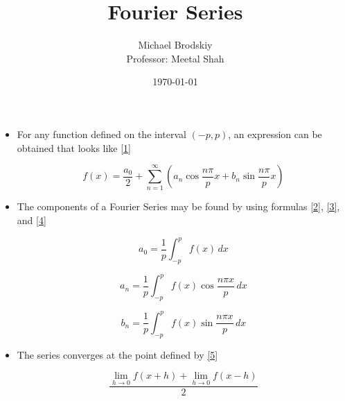 \documentclass[12pt]{article}
\title{Fourier Series}
\date{\today}
\author{Michael Brodskiy\\ \small Professor: Meetal Shah}
\begin{document}
\maketitle

\begin{itemize}

  \item For any function defined on the interval $(-p,p)$, an expression can be obtained that looks like \eqref{1}

    \begin{equation}
    f(x)=\frac{a_0}{2}+\sum_{n=1}^{\infty}\left( a_n\cos\frac{n\pi}{p}x+b_n\sin\frac{n\pi}{p}x \right)
      \label{1}
    \end{equation}

  \item The components of a Fourier Series may be found by using formulas \eqref{2}, \eqref{3}, and \eqref{4}

    \begin{equation}
      a_0=\frac{1}{p}\int_{-p}^pf(x)\,dx
      \label{2}
    \end{equation}

    \begin{equation}
      a_n=\frac{1}{p}\int_{-p}^pf(x)\cos\frac{n\pi x}{p}\,dx
      \label{3}
    \end{equation}

    \begin{equation}
      b_n=\frac{1}{p}\int_{-p}^pf(x)\sin\frac{n\pi x}{p}\,dx
      \label{4}
    \end{equation}

  \item The series converges at the point defined by \eqref{5}

    \begin{equation}
      \frac{\lim_{h\to 0}f(x+h)+\lim_{h\to 0}f(x-h)}{2}
      \label{5}
    \end{equation}

\end{itemize}
\end{document}
